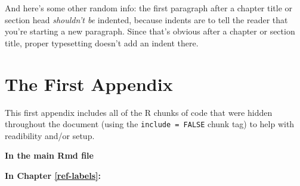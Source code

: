 \documentclass[12pt,twoside]{reedthesis}
\theoremstyle{definition}
\theoremstyle{definition}
\theoremstyle{remark}
\begin{document}
  And here's some other random info: the first paragraph after a chapter
  title or section head \emph{shouldn't be} indented, because indents are
  to tell the reader that you're starting a new paragraph. Since that's
  obvious after a chapter or section title, proper typesetting doesn't add
  an indent there.
  
  \appendix
  
  \chapter{The First Appendix}\label{the-first-appendix}
  
  This first appendix includes all of the R chunks of code that were
  hidden throughout the document (using the \texttt{include\ =\ FALSE}
  chunk tag) to help with readibility and/or setup.
  
  \textbf{In the main Rmd file}
  
  \begin{Shaded}
  \begin{Highlighting}[]
    \NormalTok{(}\NormalTok{, } \NormalTok{)}
    \NormalTok{(}\NormalTok{)}
  \end{Highlighting}
  \end{Shaded}
  
  \textbf{In Chapter \ref{ref-labels}:}
  
\end{document}
